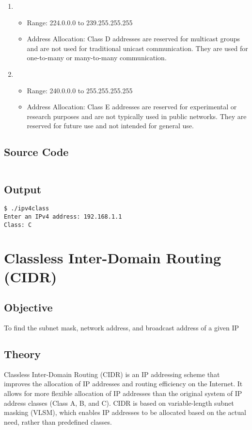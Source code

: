 \documentclass{korigamik}
\begin{document}
\begin{enumerate}[label=\textbf{Class \Alph*:}, leftmargin=2cm]
	\item \begin{itemize}
		      \item Range: 224.0.0.0 to 239.255.255.255
		      \item Address Allocation: Class D addresses are reserved for multicast groups and are not used for traditional unicast communication. They are used for one-to-many or many-to-many communication.
	      \end{itemize}
	      
	\item \begin{itemize}
		      \item Range: 240.0.0.0 to 255.255.255.255
		      \item Address Allocation: Class E addresses are reserved for experimental or research purposes and are not typically used in public networks. They are reserved for future use and not intended for general use.
	      \end{itemize}
\end{enumerate}


\subsection{Source Code}

\inputminted[firstline=5, lastline=25, fontsize=\footnotesize]{cpp}{code/ipv4class.cpp}

\subsection{Output}

\begin{lstlisting}[style=output]
$ ./ipv4class
Enter an IPv4 address: 192.168.1.1
Class: C
\end{lstlisting}

\pagebreak

\section{Classless Inter-Domain Routing (CIDR)}
\label{sec:cidr}

\subsection{Objective}
To find the subnet mask, network address, and broadcast address of a given IP

\subsection{Theory}
Classless Inter-Domain Routing (CIDR) is an IP addressing scheme that improves
the allocation of IP addresses and routing efficiency on the Internet. It
allows for more flexible allocation of IP addresses than the original system of
IP address classes (Class A, B, and C). CIDR is based on variable-length subnet
masking (VLSM), which enables IP addresses to be allocated based on the actual
need, rather than predefined classes.
\end{document}
